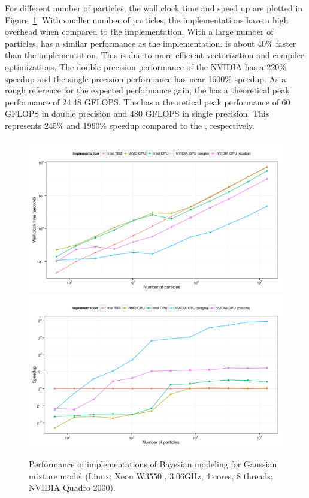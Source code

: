For different number of particles, the wall clock time and speed up are
plotted in Figure~\ref{fig:bench-ocl-perf}. With smaller number of particles,
the \opencl implementations have a high overhead when compared to the \tbb
implementation. With a large number of particles, \aocl has a similar
performance as the \tbb implementation. \iocl is about 40\% faster than the
\tbb implementation. This is due to more efficient vectorization and compiler
optimizations. The double precision performance of the NVIDIA \gpu has a 220\%
speedup and the single precision performance has near 1600\% speedup. As a
rough reference for the expected performance gain, the \cpu has a theoretical
peak performance of 24.48 GFLOPS. The \gpu has a theoretical peak performance
of 60 GFLOPS in double precision and 480 GFLOPS in single precision. This
represents 245\% and 1960\% speedup compared to the \cpu, respectively.

\begin{figure}
  \centering
  \includegraphics[width=\linewidth]{fig/bench-ocl-time-running}
  \includegraphics[width=\linewidth]{fig/bench-ocl-speedup-running}
  \caption[Performance of \protect\vsmc \protect\opencl implementations]
  {Performance of \opencl implementations of Bayesian modeling for
    Gaussian mixture model (Linux; Xeon W3550 \gpu, 3.06GHz, 4 cores, 8
    threads; NVIDIA Quadro 2000).}
  \label{fig:bench-ocl-perf}
\end{figure}

